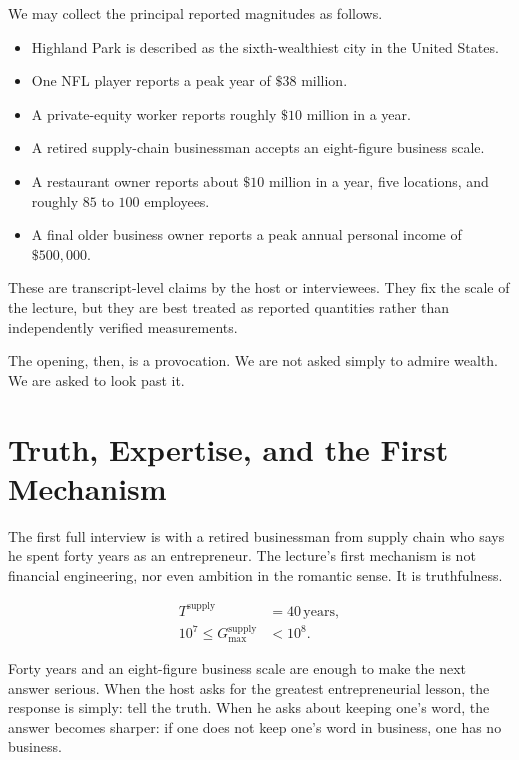 We may collect the principal reported magnitudes as follows.
\begin{itemize}
\item Highland Park is described as the sixth-wealthiest city in the United States.
\item One NFL player reports a peak year of \(\$38\) million.
\item A private-equity worker reports roughly \(\$10\) million in a year.
\item A retired supply-chain businessman accepts an eight-figure business scale.
\item A restaurant owner reports about \(\$10\) million in a year, five locations, and roughly \(85\) to \(100\) employees.
\item A final older business owner reports a peak annual personal income of \(\$500{,}000\).
\end{itemize}

\begin{remark}
These are transcript-level claims by the host or interviewees. They fix the scale of the lecture, but they are best treated as reported quantities rather than independently verified measurements.
\end{remark}

The opening, then, is a provocation. We are not asked simply to admire wealth. We are asked to look past it.

\section{Truth, Expertise, and the First Mechanism}

The first full interview is with a retired businessman from supply chain who says he spent forty years as an entrepreneur. The lecture's first mechanism is not financial engineering, nor even ambition in the romantic sense. It is truthfulness.

\begin{align}
T^{\mathrm{supply}} &= 40\,\text{years},\\
10^7 \le G_{\max}^{\mathrm{supply}} &< 10^8.
\end{align}

Forty years and an eight-figure business scale are enough to make the next answer serious. When the host asks for the greatest entrepreneurial lesson, the response is simply: tell the truth. When he asks about keeping one's word, the answer becomes sharper: if one does not keep one's word in business, one has no business.

